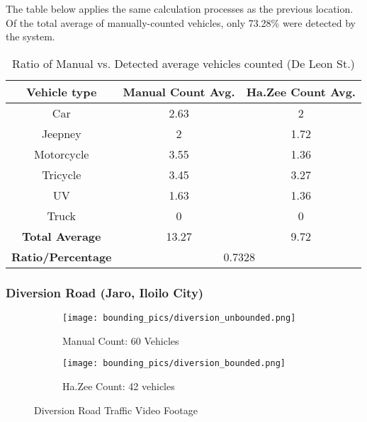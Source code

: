 The table below applies the same calculation processes as the previous location. Of the total average of manually-counted vehicles, only 73.28\% were detected by the system. 



\begin{table}[ht]   %
	\centering
	\caption{Ratio of Manual vs. Detected average vehicles counted  (De Leon St.)} \vspace{0.25em}
	\begin{tabular}{c|c|c} \hline
		\centering \textbf {Vehicle type} & \textbf{Manual Count Avg.} & \textbf{Ha.Zee Count Avg.}\\ \hline
		Car & 2.63 & 2    \\ 
		Jeepney & 2 & 1.72  	\\ 
		Motorcycle& 3.55  & 1.36  \\ 
		Tricycle   & 3.45  & 3.27  \\ 
		UV & 1.63 & 1.36  \\ 
		Truck & 0 & 0 \\ \hline
		
		\textbf{Total Average} &13.27 & 9.72   \\ \hline
		
		\textbf{Ratio/Percentage} & \multicolumn{2}{c}{0.7328}  \\ \hline
		
	\end{tabular}
	\label{tab:de_leon}
\end{table}

\subsubsection{Diversion Road (Jaro, Iloilo City)
}


\begin{figure}[!htbp]
	\begin{subfigure}{.5\textwidth}
		\centering
		\texttt{[image: bounding\_pics/diversion\_unbounded.png]}
		\caption{Manual Count: 60 Vehicles}
		
	\end{subfigure}%
	\begin{subfigure}{.5\textwidth}
		\centering
		\texttt{[image: bounding\_pics/diversion\_bounded.png]}
		\caption{Ha.Zee Count: 42 vehicles}
	\end{subfigure}
	\caption{Diversion Road Traffic Video Footage}
\end{figure}
\FloatBarrier

